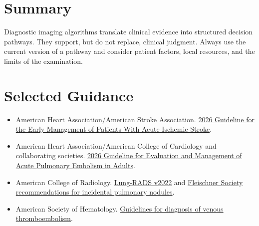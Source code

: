 \clearpage

\section{Summary}
Diagnostic imaging algorithms translate clinical evidence into structured decision pathways. They support, but do not replace, clinical judgment. Always use the current version of a pathway and consider patient factors, local resources, and the limits of the examination.

\section*{Selected Guidance}
\begin{itemize}
    \item American Heart Association/American Stroke Association. \href{https://www.ahajournals.org/doi/10.1161/STR.0000000000000513}{2026 Guideline for the Early Management of Patients With Acute Ischemic Stroke}.
    \item American Heart Association/American College of Cardiology and collaborating societies. \href{https://www.ahajournals.org/doi/pdf/10.1161/CIR.0000000000001415}{2026 Guideline for Evaluation and Management of Acute Pulmonary Embolism in Adults}.
    \item American College of Radiology. \href{https://www.acr.org/-/media/ACR/Files/RADS/Lung-RADS/Lung-RADS-2022.pdf}{Lung-RADS v2022} and \href{https://pubs.rsna.org/doi/10.1148/radiol.2017161659}{Fleischner Society recommendations for incidental pulmonary nodules}.
    \item American Society of Hematology. \href{https://pmc.ncbi.nlm.nih.gov/articles/PMC6258916/}{Guidelines for diagnosis of venous thromboembolism}.
\end{itemize}

\clearpage
